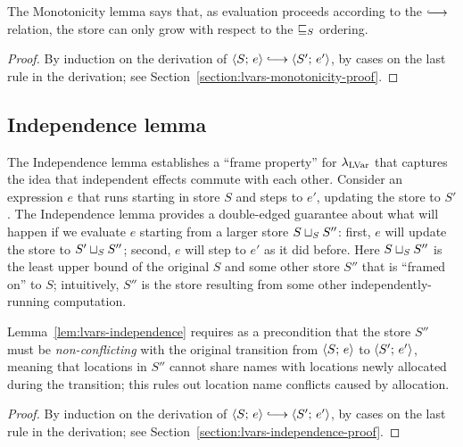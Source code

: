 
The Monotonicity lemma says that, as evaluation proceeds according to
the $\parstepsto$ relation, the store can only grow with respect to
the $ \sqsubseteq_S $ ordering.

\LVarsLemMonotonicity
\begin{proof}
  By induction on the derivation of $\config{S}{e} \parstepsto
  \config{S'}{e'}$, by cases on the last rule in the derivation; see
  Section~\ref{section:lvars-monotonicity-proof}.
\end{proof}

\subsection{Independence lemma}\label{subsection:lvars-independence}


The Independence lemma establishes a ``frame property'' for
$\lambda_{\textrm{LVar}}$ that captures the idea that independent effects commute
with each other.  Consider an expression $e$ that runs starting in
store $S$ and steps to $e'$, updating the store to $S'$.  The
Independence lemma provides a double-edged guarantee about what will
happen if we evaluate $e$ starting from a larger store
$S \sqcup_{S} S''$: first, $e$ will update the store to
$S' \sqcup_{S} S''$; second, $e$ will step to $e'$ as it did before.
Here $S \sqcup_{S} S''$ is the least upper bound of the original $S$
and some other store $S''$ that is ``framed on'' to $S$; intuitively,
$S''$ is the store resulting from some other independently-running
computation.

Lemma~\ref{lem:lvars-independence} requires as a precondition that the
store $S''$ must be \emph{non-conflicting} with the original
transition from $\langle S;\, e \rangle$ to $\langle S';\, e' \rangle$, meaning that
locations in $S''$ cannot share names with locations newly allocated
during the transition; this rules out location name conflicts caused
by allocation.

\LVarsDefNonConflicting

\LVarsLemIndependence
\begin{proof}
  By induction on the derivation of $\config{S}{e} \parstepsto
  \config{S'}{e'}$, by cases on the last rule in the derivation; see
  Section~\ref{section:lvars-independence-proof}.
\end{proof}

